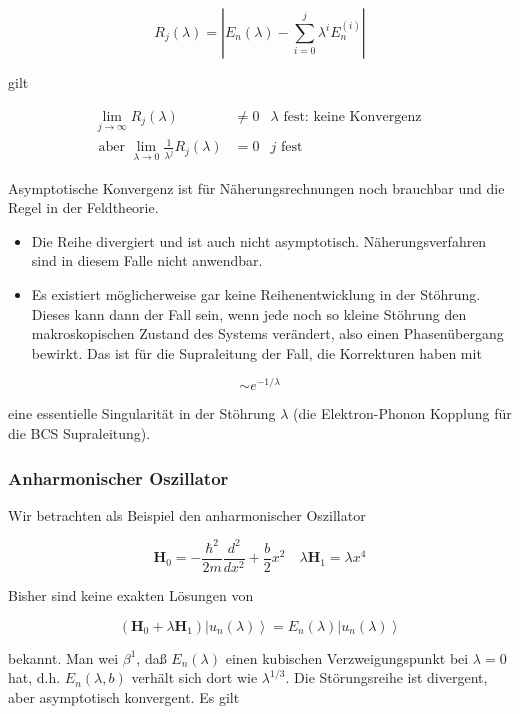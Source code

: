\documentclass[10pt, letterpaper]{article}
\begin{document}
$$
R_{j}(\lambda)=\left|E_{n}(\lambda)-\sum_{i=0}^{j} \lambda^{i} E_{n}^{(i)}\right|
$$

gilt

$$
\begin{array}{rlrl}
\lim _{j \rightarrow \infty} R_{j}(\lambda) & \neq 0 & \lambda \text { fest: keine Konvergenz } \\
\text { aber } \lim _{\lambda \rightarrow 0} \frac{1}{\lambda^{j}} R_{j}(\lambda) & =0 & j \text { fest }
\end{array}
$$

Asymptotische Konvergenz ist für Näherungsrechnungen noch brauchbar und die Regel in der Feldtheorie.

\begin{itemize}
  \item Die Reihe divergiert und ist auch nicht asymptotisch. Näherungsverfahren sind in diesem Falle nicht anwendbar.
  \item Es existiert möglicherweise gar keine Reihenentwicklung in der Stöhrung. Dieses kann dann der Fall sein, wenn jede noch so kleine Stöhrung den makroskopischen Zustand des Systems verändert, also einen Phasenübergang bewirkt. Das ist für die Supraleitung der Fall, die Korrekturen haben mit
\end{itemize}

$$
\sim e^{-1 / \lambda}
$$

eine essentielle Singularität in der Stöhrung $\lambda$ (die Elektron-Phonon Kopplung für die BCS Supraleitung).

\subsubsection*{Anharmonischer Oszillator}
Wir betrachten als Beispiel den anharmonischer Oszillator

$$
\mathbf{H}_{0}=-\frac{\hbar^{2}}{2 m} \frac{d^{2}}{d x^{2}}+\frac{b}{2} x^{2} \quad \lambda \mathbf{H}_{1}=\lambda x^{4}
$$

Bisher sind keine exakten Lösungen von

$$
\left(\mathbf{H}_{0}+\lambda \mathbf{H}_{1}\right)\left|u_{n}(\lambda)\right\rangle=E_{n}(\lambda)\left|u_{n}(\lambda)\right\rangle
$$

bekannt. Man wei $\beta^{1}$, daß $E_{n}(\lambda)$ einen kubischen Verzweigungspunkt bei $\lambda=0$ hat, d.h. $E_{n}(\lambda, b)$ verhält sich dort wie $\lambda^{1 / 3}$. Die Störungsreihe ist divergent, aber asymptotisch konvergent. Es gilt
\end{document}
